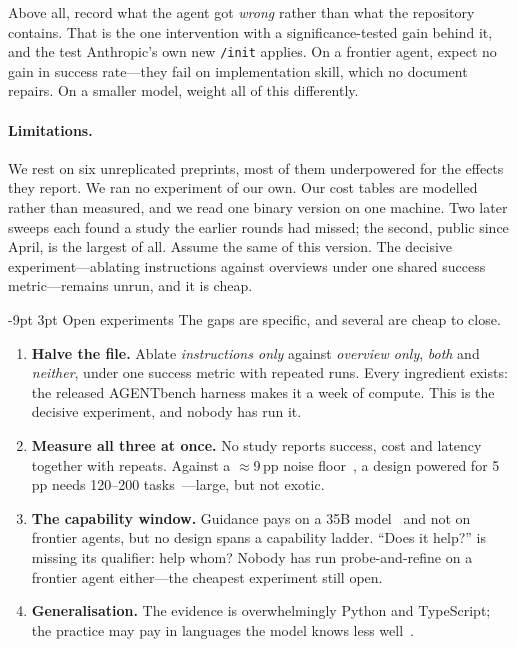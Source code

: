 \documentclass[10pt,twocolumn,a4paper]{article}
\makeatletter
\renewcommand\section{\@startsection{section}{1}{\z@}%
  {-9pt \@plus -2pt \@minus -1pt}{3pt}%
  {\normalfont\large\bfseries\color{acc}}}
\makeatother
\begin{document}
Above all, record what the agent got \emph{wrong} rather than what the repository
contains. That is the one intervention with a significance-tested gain behind it,
and the test Anthropic's own new \texttt{/init} applies. On a frontier
agent, expect no gain in success rate---they fail on implementation skill, which
no document repairs. On a smaller model, weight all of this differently.

\paragraph{Limitations.} We rest on six unreplicated preprints, most of them
underpowered for the effects they report. We ran no experiment of our own. Our
cost tables are modelled rather than measured, and we read one binary version on
one machine. Two later sweeps each found a study the earlier rounds had missed; the
second, public since April, is the largest of all. Assume the same of this version. The
decisive experiment---ablating instructions against overviews under one shared
success metric---remains unrun, and it is cheap.


\section{Open experiments}
The gaps are specific, and several are cheap to close.

\begin{enumerate}\setlength{\itemsep}{1pt}\setlength{\topsep}{2pt}
\item \textbf{Halve the file.} Ablate \emph{instructions only} against
\emph{overview only}, \emph{both} and \emph{neither}, under one success metric
with repeated runs. Every ingredient exists: the released AGENTbench harness makes
it a week of compute. This is the decisive experiment, and nobody has run it.
\item \textbf{Measure all three at once.} No study reports success, cost and
latency together with repeats. Against a $\approx$9\,pp noise
floor~\cite{sambodden}, a design powered for 5\,pp needs 120--200
tasks~\cite{khatri}---large, but not exotic.
\item \textbf{The capability window.} Guidance pays on a 35B
model~\cite{shepard} and not on frontier agents, but no design spans a capability
ladder. ``Does it help?'' is missing its qualifier: help whom? Nobody has run
probe-and-refine on a frontier agent either---the cheapest experiment still open.
\item \textbf{Generalisation.} The evidence is overwhelmingly Python and
TypeScript; the practice may pay in languages the model knows less
well~\cite{gloaguen}.
\end{enumerate}
\end{document}
